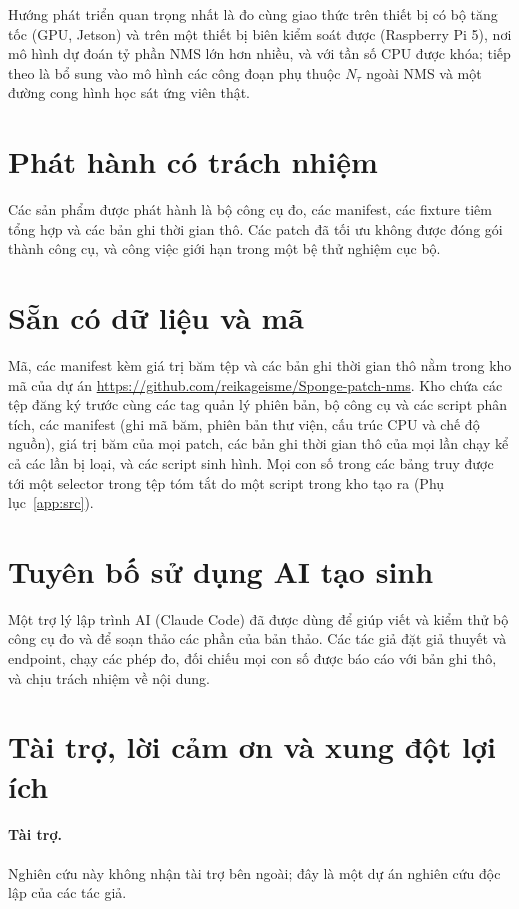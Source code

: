 \documentclass[a4paper,fleqn]{cas-dc}
\newcommand{\Ntau}{N_{\tau}}
\begin{document}
Hướng phát triển quan trọng nhất là đo cùng giao thức trên thiết bị có bộ tăng tốc (GPU, Jetson) và trên một thiết bị biên kiểm soát được (Raspberry Pi 5), nơi mô hình dự đoán tỷ phần NMS lớn hơn nhiều, và với tần số CPU được khóa; tiếp theo là bổ sung vào mô hình các công đoạn phụ thuộc $\Ntau$ ngoài NMS và một đường cong hình học sát ứng viên thật.

\FloatBarrier
\section*{Phát hành có trách nhiệm}
Các sản phẩm được phát hành là bộ công cụ đo, các manifest, các fixture tiêm tổng hợp và các bản ghi thời gian thô. Các patch đã tối ưu không được đóng gói thành công cụ, và công việc giới hạn trong một bệ thử nghiệm cục bộ.

\section*{Sẵn có dữ liệu và mã}
Mã, các manifest kèm giá trị băm tệp và các bản ghi thời gian thô nằm trong kho mã của dự án \url{https://github.com/reikageisme/Sponge-patch-nms}. Kho chứa các tệp đăng ký trước cùng các tag quản lý phiên bản, bộ công cụ và các script phân tích, các manifest (ghi mã băm, phiên bản thư viện, cấu trúc CPU và chế độ nguồn), giá trị băm của mọi patch, các bản ghi thời gian thô của mọi lần chạy kể cả các lần bị loại, và các script sinh hình. Mọi con số trong các bảng truy được tới một selector trong tệp tóm tắt do một script trong kho tạo ra (Phụ lục~\ref{app:src}).

\section*{Tuyên bố sử dụng AI tạo sinh}
Một trợ lý lập trình AI (Claude Code) đã được dùng để giúp viết và kiểm thử bộ công cụ đo và để soạn thảo các phần của bản thảo. Các tác giả đặt giả thuyết và endpoint, chạy các phép đo, đối chiếu mọi con số được báo cáo với bản ghi thô, và chịu trách nhiệm về nội dung.

\section*{Tài trợ, lời cảm ơn và xung đột lợi ích}
\paragraph{Tài trợ.} Nghiên cứu này không nhận tài trợ bên ngoài; đây là một dự án nghiên cứu độc lập của các tác giả.
\end{document}
